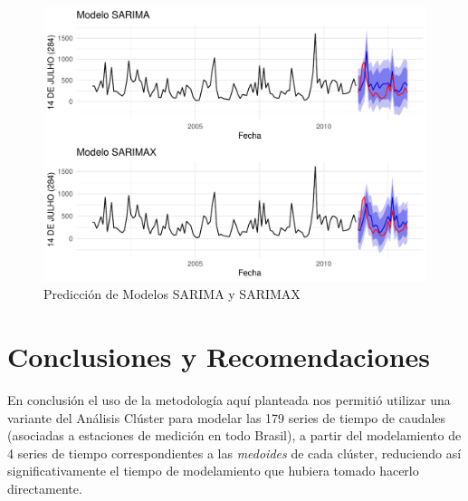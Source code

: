 \documentclass[12pt,oneside]{book}\usepackage[]{graphicx}\usepackage[]{color}
\makeatletter
\def\maxwidth{ %
  \ifdim\Gin@nat@width>\linewidth
    \linewidth
  \else
    \Gin@nat@width
  \fi
}
\newenvironment{knitrout}{}{} %
\theoremstyle{definition} %
\makeatother
\begin{document}
\begin{knitrout}
\color{fgcolor}\begin{figure}[h]

{\centering \includegraphics[width=\maxwidth]{figure/unnamed-chunk-62-1} 

}

\caption{\label{fig:predic14} Predicción de Modelos SARIMA y SARIMAX}\label{fig:unnamed-chunk-62}
\end{figure}


\end{knitrout}





\chapter{Conclusiones y Recomendaciones}





En conclusión el uso de la metodología aquí planteada nos permitió utilizar una variante del Análisis Clúster para modelar las 179 series de tiempo de caudales (asociadas a estaciones de medición en todo Brasil), a partir del modelamiento de 4 series de tiempo correspondientes a las \textit{medoides} de cada clúster, reduciendo así significativamente el tiempo de modelamiento que hubiera tomado hacerlo directamente. 
\end{document}
